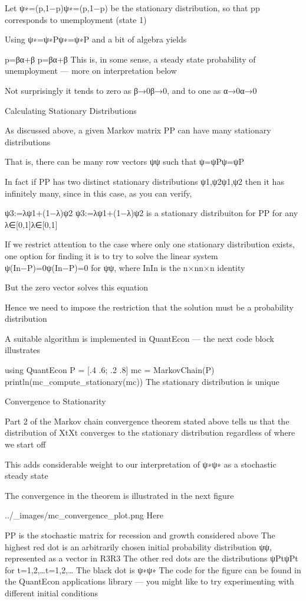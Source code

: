 Let ψ∗=(p,1−p)ψ∗=(p,1−p) be the stationary distribution, so that pp corresponds to unemployment (state 1)

Using ψ∗=ψ∗Pψ∗=ψ∗P and a bit of algebra yields

p=βα+β
p=βα+β
This is, in some sense, a steady state probability of unemployment — more on interpretation below

Not surprisingly it tends to zero as β→0β→0, and to one as α→0α→0

Calculating Stationary Distributions

As discussed above, a given Markov matrix PP can have many stationary distributions

That is, there can be many row vectors ψψ such that ψ=ψPψ=ψP

In fact if PP has two distinct stationary distributions ψ1,ψ2ψ1,ψ2 then it has infinitely many, since in this case, as you can verify,

ψ3:=λψ1+(1−λ)ψ2
ψ3:=λψ1+(1−λ)ψ2
is a stationary distribuiton for PP for any λ∈[0,1]λ∈[0,1]

If we restrict attention to the case where only one stationary distribution exists, one option for finding it is to try to solve the linear system ψ(In−P)=0ψ(In−P)=0 for ψψ, where InIn is the n×nn×n identity

But the zero vector solves this equation

Hence we need to impose the restriction that the solution must be a probability distribution

A suitable algorithm is implemented in QuantEcon — the next code block illustrates

using QuantEcon P = [.4 .6; .2 .8] mc = MarkovChain(P) println(mc_compute_stationary(mc))
The stationary distribution is unique

Convergence to Stationarity

Part 2 of the Markov chain convergence theorem stated above tells us that the distribution of XtXt converges to the stationary distribution regardless of where we start off

This adds considerable weight to our interpretation of ψ∗ψ∗ as a stochastic steady state

The convergence in the theorem is illustrated in the next figure

../_images/mc_convergence_plot.png
Here

PP is the stochastic matrix for recession and growth considered above
The highest red dot is an arbitrarily chosen initial probability distribution ψψ, represented as a vector in R3R3
The other red dots are the distributions ψPtψPt for t=1,2,…t=1,2,…
The black dot is ψ∗ψ∗
The code for the figure can be found in the QuantEcon applications library — you might like to try experimenting with different initial conditions

